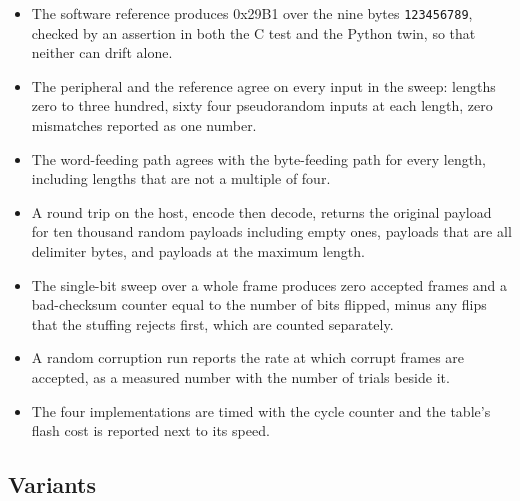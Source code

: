 \begin{itemize}
\item The software reference produces 0x29B1 over the nine bytes
\texttt{123456789}, checked by an assertion in both the C test and the Python
twin, so that neither can drift alone.
\item The peripheral and the reference agree on every input in the sweep:
lengths zero to three hundred, sixty four pseudorandom inputs at each length,
zero mismatches reported as one number.
\item The word-feeding path agrees with the byte-feeding path for every length,
including lengths that are not a multiple of four.
\item A round trip on the host, encode then decode, returns the original
payload for ten thousand random payloads including empty ones, payloads that are
all delimiter bytes, and payloads at the maximum length.
\item The single-bit sweep over a whole frame produces zero accepted frames and
a bad-checksum counter equal to the number of bits flipped, minus any flips that
the stuffing rejects first, which are counted separately.
\item A random corruption run reports the rate at which corrupt frames are
accepted, as a measured number with the number of trials beside it.
\item The four implementations are timed with the cycle counter and the table's
flash cost is reported next to its speed.
\end{itemize}

\subsection*{Variants}

